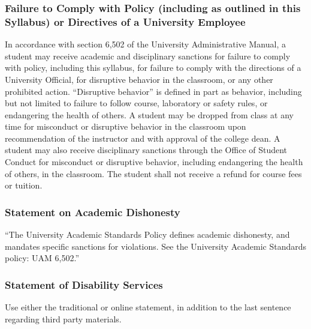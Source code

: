 \documentclass[
]{article}
\begin{document}
\hypertarget{failure-to-comply-with-policy-including-as-outlined-in-this-syllabus-or-directives-of-a-university-employee}{%
\subsubsection{Failure to Comply with Policy (including as outlined in
this Syllabus) or Directives of a University
Employee}\label{failure-to-comply-with-policy-including-as-outlined-in-this-syllabus-or-directives-of-a-university-employee}}

In accordance with section 6,502 of the University Administrative
Manual, a student may receive academic and disciplinary sanctions for
failure to comply with policy, including this syllabus, for failure to
comply with the directions of a University Official, for disruptive
behavior in the classroom, or any other prohibited action. ``Disruptive
behavior'' is defined in part as behavior, including but not limited to
failure to follow course, laboratory or safety rules, or endangering the
health of others. A student may be dropped from class at any time for
misconduct or disruptive behavior in the classroom upon recommendation
of the instructor and with approval of the college dean. A student may
also receive disciplinary sanctions through the Office of Student
Conduct for misconduct or disruptive behavior, including endangering the
health of others, in the classroom. The student shall not receive a
refund for course fees or tuition.

\hypertarget{statement-on-academic-dishonesty-1}{%
\subsubsection{Statement on Academic
Dishonesty}\label{statement-on-academic-dishonesty-1}}

``The University Academic Standards Policy defines academic dishonesty,
and mandates specific sanctions for violations. See the University
Academic Standards policy: UAM 6,502.''

\hypertarget{statement-of-disability-services}{%
\subsubsection{Statement of Disability
Services}\label{statement-of-disability-services}}

Use either the traditional or online statement, in addition to the last
sentence regarding third party materials.
\end{document}
